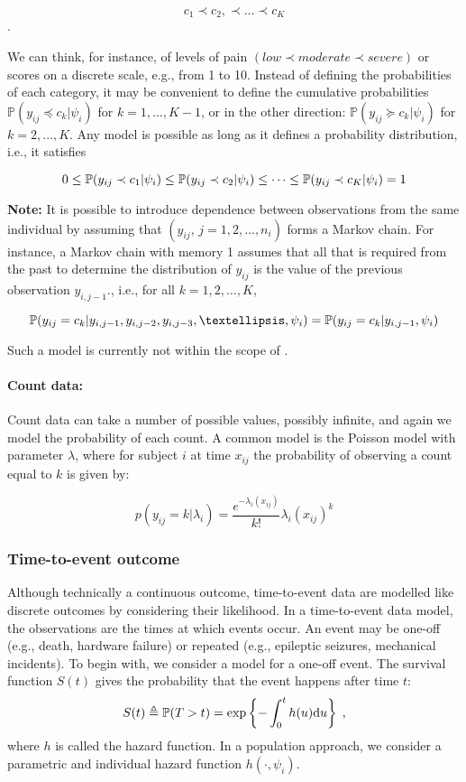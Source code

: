 $$c_1 \prec c_2,\prec \ldots \prec c_K $$.

We can think, for instance, of levels of pain $(low \prec moderate \prec severe)$ or scores on a discrete scale, e.g., from 1 to 10. Instead of defining the probabilities of each category, it may be convenient to define the cumulative probabilities $\mathbb{P}(y_{ij} \preceq c_k | \psi_i)$ for $k=1,\ldots ,K-1$, or in the other direction: $\mathbb{P}(y_{ij} \succeq c_k | \psi_i)$ for $k=2,\ldots, K$. Any model is possible as long as it defines a probability distribution, i.e., it satisfies

$$0\leq\mathbb{P}(y_{ij}\prec c_1|\psi_i)\leq\mathbb{P}(y_{ij}\prec c_2|\psi_i)\leq \cdots \leq\mathbb{P}(y_{ij}\prec c_K|\psi_i)=1$$


{\bf Note:} It is possible to introduce dependence between observations from the same individual by assuming that $(y_{ij},\,j=1,2,\ldots,n_i)$ forms a Markov chain. For instance, a Markov chain with memory 1 assumes that all that is required from the past to determine the distribution of $y_{ij}$ is the value of the previous observation $y_{i,j-1}$., i.e., for all $k=1,2,\ldots ,K$,

$$\prob(y_{ij}=c_k|y_{i,j-1},y_{i,j-2},y_{i,j-3},…,\psi_i)=\prob(y_{ij}=c_k|y_{i,j-1},\psi_i)$$

Such a model is currently not within the scope of \monolix.

\paragraph{Count data:} Count data can take a number of possible values, possibly infinite, and again we model the probability of each count. A common model is the Poisson model with parameter $\lambda$, where for subject $i$ at time $x_{ij}$ the probability of observing a count equal to $k$ is given by:

$$p(y_{ij} = k | \lambda_i) = \dfrac{e^{-\lambda_i(x_{ij})}}{k!}\lambda_i(x_{ij})^k $$

\subsubsection{Time-to-event outcome}

Although technically a continuous outcome, time-to-event data are modelled like discrete outcomes by considering their likelihood. In a time-to-event data model, the observations are the times at which events occur. An event may be one-off (e.g., death, hardware failure) or repeated (e.g., epileptic seizures, mechanical incidents).
To begin with, we consider a model for a one-off event. The survival function $S(t)$ gives the probability that the event happens after time $t$:
\begin{equation}\label{survival}
S(t)  \triangleq \mathbb{P}(T >t) = \exp\left\{-\int_{0}^{t}h(u)\textrm{d}u\right\}\;,
\end{equation}
where $h$ is called the hazard function. 
In a population approach, we consider a parametric and individual hazard function $h(\cdot,\psi_i)$.

